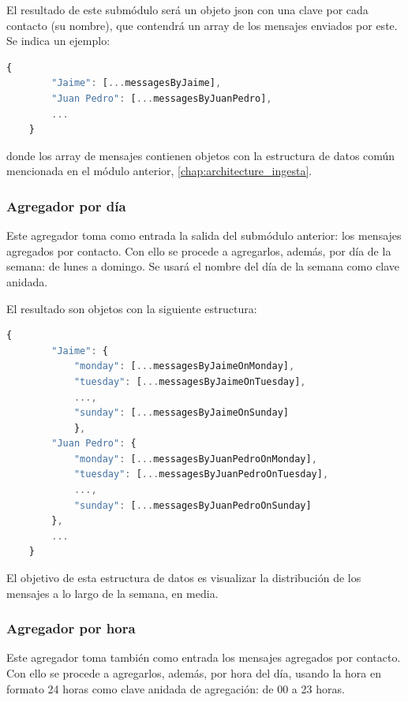 El resultado de este submódulo será un objeto \acrshort{json} con una clave por cada contacto (su nombre), que contendrá un array de los mensajes enviados por este. Se indica un ejemplo:

\begin{lstlisting}[language=JavaScript]
	{
		"Jaime": [...messagesByJaime],
		"Juan Pedro": [...messagesByJuanPedro],
		...
	}
\end{lstlisting}

donde los array de mensajes contienen objetos con la estructura de datos común mencionada en el módulo anterior,  \autoref{chap:architecture_ingesta}.

\subsubsection{Agregador por día}

Este agregador toma como entrada la salida del submódulo anterior: los mensajes agregados por contacto. Con ello se procede a agregarlos, además, por día de la semana: de lunes a domingo. Se usará el nombre del día de la semana como clave anidada.

El resultado son objetos con la siguiente estructura:

\begin{lstlisting}[language=JavaScript]
	{
		"Jaime": {
			"monday": [...messagesByJaimeOnMonday],
			"tuesday": [...messagesByJaimeOnTuesday],
			...,
			"sunday": [...messagesByJaimeOnSunday]
			},
		"Juan Pedro": {
			"monday": [...messagesByJuanPedroOnMonday],
			"tuesday": [...messagesByJuanPedroOnTuesday],
			...,
			"sunday": [...messagesByJuanPedroOnSunday]
		},
		...
	}
\end{lstlisting}

El objetivo de esta estructura de datos es visualizar la distribución de los mensajes a lo largo de la semana, en media.

\subsubsection{Agregador por hora}

Este agregador toma también como entrada los mensajes agregados por contacto. Con ello se procede a agregarlos, además, por hora del día, usando la hora en formato 24 horas como clave anidada de agregación: de 00 a 23 horas.


